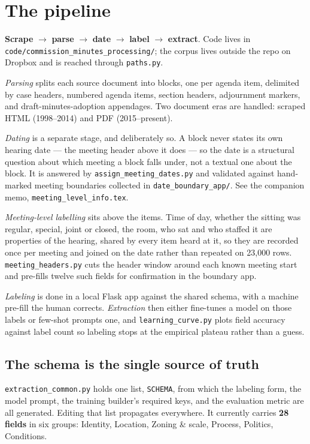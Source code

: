 \documentclass[11pt]{article}
\begin{document}
\section{The pipeline}

\textbf{Scrape} $\to$ \textbf{parse} $\to$ \textbf{date} $\to$ \textbf{label} $\to$
\textbf{extract}. Code lives in \texttt{code/commission\_minutes\_processing/}; the corpus
lives outside the repo on Dropbox and is reached through \texttt{paths.py}.

\emph{Parsing} splits each source document into blocks, one per agenda item, delimited by
case headers, numbered agenda items, section headers, adjournment markers, and
draft-minutes-adoption appendages. Two document eras are handled: scraped HTML
(1998--2014) and PDF (2015--present).

\emph{Dating} is a separate stage, and deliberately so. A block never states its own
hearing date --- the meeting header above it does --- so the date is a structural question
about which meeting a block falls under, not a textual one about the block. It is answered
by \texttt{assign\_meeting\_dates.py} and validated against hand-marked meeting boundaries
collected in \texttt{date\_boundary\_app/}. See the companion memo,
\texttt{meeting\_level\_info.tex}.

\emph{Meeting-level labelling} sits above the items. Time of day, whether the sitting was
regular, special, joint or closed, the room, who sat and who staffed it are properties of
the hearing, shared by every item heard at it, so they are recorded once per meeting and
joined on the date rather than repeated on 23{,}000 rows.
\texttt{meeting\_headers.py} cuts the header window around each known meeting start and
pre-fills twelve such fields for confirmation in the boundary app.

\emph{Labeling} is done in a local Flask app against the shared schema, with a machine
pre-fill the human corrects. \emph{Extraction} then either fine-tunes a model on those
labels or few-shot prompts one, and \texttt{learning\_curve.py} plots field accuracy
against label count so labeling stops at the empirical plateau rather than a guess.

\subsection{The schema is the single source of truth}

\texttt{extraction\_common.py} holds one list, \texttt{SCHEMA}, from which the labeling
form, the model prompt, the training builder's required keys, and the evaluation metric
are all generated. Editing that list propagates everywhere. It currently carries
\textbf{28 fields} in six groups: Identity, Location, Zoning \& scale, Process, Politics,
Conditions.
\end{document}

